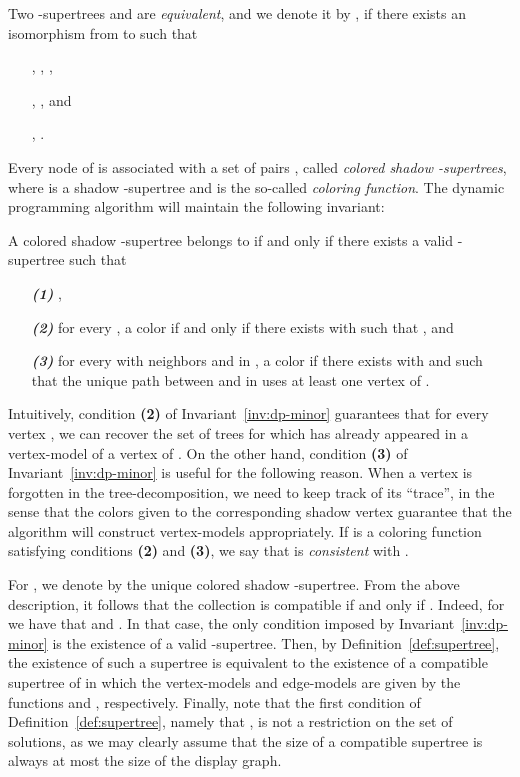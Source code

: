 \begin{definition}\label{def:equivalent} Two -supertrees  and  are \emph{equivalent}, and we denote it by  , if  there exists an isomorphism  from  to  such that
\begin{itemize}
\item[]  , , ,
\item[] , , and \item[] , .
\end{itemize}
\end{definition}

Every  node  of  is associated with a set  of pairs  , called \emph{colored shadow -supertrees}, where  is a shadow -supertree and  is the so-called \emph{coloring function}.
The dynamic programming algorithm will maintain the following invariant:

\begin{invariant} \label{inv:dp-minor}
{A colored shadow -supertree  belongs to  if and only if there exists a valid -supertree  such that}

\begin{itemize}
\item[\emph{\textbf{(1)}}] ,
\item[\emph{\textbf{(2)}}] for every , a color  if and only if there exists  with   such that , and
\item[\emph{\textbf{(3)}}] for every  with neighbors  and  in , a color  if there exists  with  and  such that
  the unique path between  and  in  uses at least one vertex of .
\end{itemize}
\end{invariant}

Intuitively, condition \textbf{(2)} of Invariant~\ref{inv:dp-minor} guarantees that for every vertex , we can recover the set of trees for which  has already appeared in a vertex-model of a vertex of .  On the other hand, condition \textbf{(3)} of Invariant~\ref{inv:dp-minor} is useful for the following reason. When a vertex is forgotten in the tree-decomposition, we need to keep track of its ``trace'', in the sense that the colors given to the corresponding shadow vertex guarantee that the algorithm will  construct vertex-models appropriately.
If  is a coloring function satisfying conditions \textbf{(2)} and \textbf{(3)}, we say that  is \emph{consistent} with .

\smallskip

 For , we denote by  the unique colored shadow -supertree. From the above description, it follows that the collection  is compatible  if and only if . Indeed, for  we have that  and . In that case, the only condition imposed by Invariant~\ref{inv:dp-minor} is the existence of a valid -supertree. Then, by Definition~\ref{def:supertree}, the existence of such a supertree is equivalent to the existence of a compatible supertree  of  in which the vertex-models and edge-models are given by the functions  and , respectively. Finally, note that the first condition of Definition~\ref{def:supertree}, namely that , is not a restriction on the set of solutions, as we may clearly assume that the size of a compatible supertree is always at most the size of the display graph.






